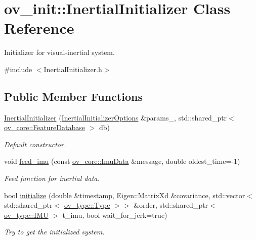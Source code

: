 \hypertarget{classov__init_1_1InertialInitializer}{}\section{ov\+\_\+init\+:\+:Inertial\+Initializer Class Reference}
\label{classov__init_1_1InertialInitializer}


Initializer for visual-\/inertial system.  




{\ttfamily \#include $<$Inertial\+Initializer.\+h$>$}

\subsection*{Public Member Functions}
\begin{DoxyCompactItemize}
\item 
\hyperlink{classov__init_1_1InertialInitializer_ab53c9effb332d8259cd04e06ab26ce5f}{Inertial\+Initializer} (\hyperlink{structov__init_1_1InertialInitializerOptions}{Inertial\+Initializer\+Options} \&params\+\_\+, std\+::shared\+\_\+ptr$<$ \hyperlink{classov__core_1_1FeatureDatabase}{ov\+\_\+core\+::\+Feature\+Database} $>$ db)
\begin{DoxyCompactList}\small\item\em Default constructor. \end{DoxyCompactList}\item 
void \hyperlink{classov__init_1_1InertialInitializer_ac7f060d9cfedc4f780574ad436c34b66}{feed\+\_\+imu} (const \hyperlink{structov__core_1_1ImuData}{ov\+\_\+core\+::\+Imu\+Data} \&message, double oldest\+\_\+time=-\/1)
\begin{DoxyCompactList}\small\item\em Feed function for inertial data. \end{DoxyCompactList}\item 
bool \hyperlink{classov__init_1_1InertialInitializer_aa2288d134687ccf1b7ee85ddcf982991}{initialize} (double \&timestamp, Eigen\+::\+Matrix\+Xd \&covariance, std\+::vector$<$ std\+::shared\+\_\+ptr$<$ \hyperlink{classov__type_1_1Type}{ov\+\_\+type\+::\+Type} $>$$>$ \&order, std\+::shared\+\_\+ptr$<$ \hyperlink{classov__type_1_1IMU}{ov\+\_\+type\+::\+I\+MU} $>$ t\+\_\+imu, bool wait\+\_\+for\+\_\+jerk=true)
\begin{DoxyCompactList}\small\item\em Try to get the initialized system. \end{DoxyCompactList}\end{DoxyCompactItemize}
